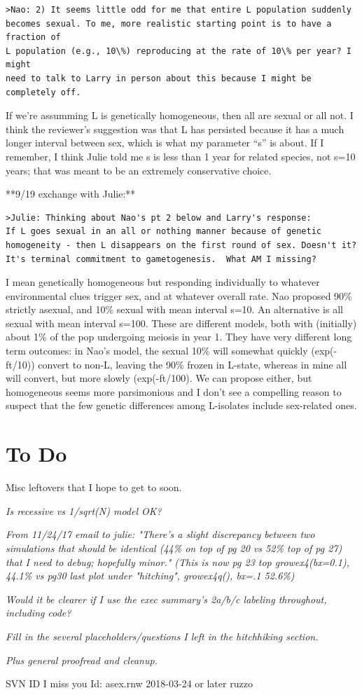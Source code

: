 \documentclass{article}\usepackage[]{graphicx}\usepackage[]{color}
\begin{document}
\begin{verbatim}
>Nao: 2) It seems little odd for me that entire L population suddenly 
becomes sexual. To me, more realistic starting point is to have a fraction of
L population (e.g., 10\%) reproducing at the rate of 10\% per year? I might
need to talk to Larry in person about this because I might be completely off.
\end{verbatim}

If we’re assumming L is genetically homogeneous, then all are sexual or all not.  I think the
reviewer’s suggestion was that L has persisted because it has a much longer interval between sex,
which is what my parameter “s” is about.  If I remember, I think Julie told me s is less than 1 year
for related species, not s=10 years; that was meant to be an extremely conservative choice.

**9/19 exchange with Julie:**

\begin{verbatim}
>Julie: Thinking about Nao's pt 2 below and Larry's response:
If L goes sexual in an all or nothing manner because of genetic
homogeneity - then L disappears on the first round of sex. Doesn't it?
It's terminal commitment to gametogenesis.  What AM I missing? 
\end{verbatim}

I mean genetically homogeneous but responding individually to whatever environmental clues trigger
sex, and at whatever overall rate.  Nao proposed 90\% strictly asexual, and 10\% sexual with mean
interval s=10.  An alternative is all sexual with mean interval s=100.  These are different models,
both with (initially) about 1\% of the pop undergoing meiosis in year 1.  They have very different
long term outcomes: in Nao's model, the sexual 10\% will somewhat quickly (exp(-ft/10)) convert to
non-L, leaving the 90\% frozen in L-state, whereas in mine all will convert, but more slowly
(exp(-ft/100).  We can propose either, but homogeneous seems more parsimonious and I don’t see a
compelling reason to suspect that the few genetic differences among L-isolates include sex-related
ones.


\section{To Do} 

Misc leftovers that I hope to get to soon.

\textit{Is recessive vs 1/sqrt(N) model OK?}

\textit{From 11/24/17 email to julie: "There’s a slight discrepancy between two simulations that
  should be identical (44\% on top of pg 20 vs 52\% top of pg 27) that I need to debug; hopefully
  minor."  (This is now pg 23 top growex4(bx=0.1), 44.1\% vs pg30 last plot under "hitching",
  growex4q(), bx=.1 52.6\%)}

\textit{Would it be clearer if I use the exec summary's 2a/b/c labeling throughout, including code?}

\textit{Fill in the several placeholders/questions I left in the hitchhiking section.}

\textit{Plus general proofread and cleanup.}

\vfill\footnotesize\flushright SVN ID I miss you $ $Id: asex.rnw 2018-03-24 or later ruzzo $ $
\end{document}
